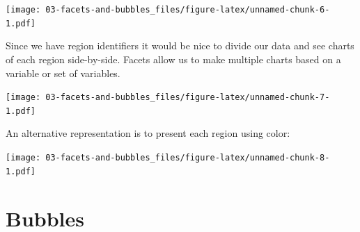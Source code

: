 \documentclass[]{book}
\newenvironment{Shaded}{\begin{snugshade}}{\end{snugshade}}
\newcommand{\KeywordTok}[1]{\textcolor[rgb]{0.13,0.29,0.53}{\textbf{{#1}}}}
\newcommand{\DataTypeTok}[1]{\textcolor[rgb]{0.13,0.29,0.53}{{#1}}}
\newcommand{\DecValTok}[1]{\textcolor[rgb]{0.00,0.00,0.81}{{#1}}}
\newcommand{\FloatTok}[1]{\textcolor[rgb]{0.00,0.00,0.81}{{#1}}}
\newcommand{\StringTok}[1]{\textcolor[rgb]{0.31,0.60,0.02}{{#1}}}
\newcommand{\OtherTok}[1]{\textcolor[rgb]{0.56,0.35,0.01}{{#1}}}
\newcommand{\NormalTok}[1]{{#1}}
\theoremstyle{definition}
\theoremstyle{definition}
\theoremstyle{remark}
\begin{document}
\texttt{[image: 03-facets-and-bubbles\_files/figure-latex/unnamed-chunk-6-1.pdf]}

Since we have region identifiers it would be nice to divide our data and
see charts of each region side-by-side. Facets allow us to make multiple
charts based on a variable or set of variables.

\begin{Shaded}
\end{Shaded}

\texttt{[image: 03-facets-and-bubbles\_files/figure-latex/unnamed-chunk-7-1.pdf]}

An alternative representation is to present each region using color:

\begin{Shaded}
\end{Shaded}

\texttt{[image: 03-facets-and-bubbles\_files/figure-latex/unnamed-chunk-8-1.pdf]}

\section{Bubbles}\label{bubbles}
\end{document}
